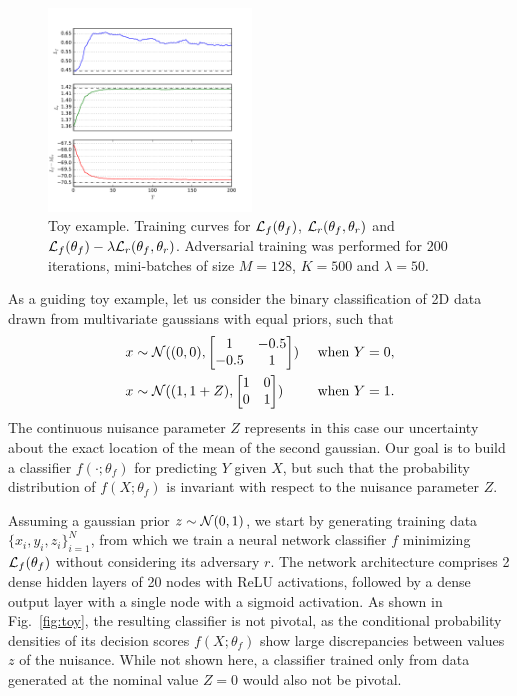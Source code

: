 \documentclass[twocolumn,superscriptaddress,aps]{revtex4-1}
\theoremstyle{plain}
\begin{document}
\begin{figure}
    \includegraphics[width=0.48\textwidth]{figures/training.pdf}
    \vspace{-1cm}
    \caption{Toy example. Training curves for ${\cal L}_f(\theta_f)$, ${\cal L}_r(\theta_f, \theta_r)$
             and ${\cal L}_f(\theta_f) - \lambda {\cal L}_r(\theta_f, \theta_r)$.
             Adversarial training was performed for $200$ iterations, mini-batches of size $M=128$, $K=500$ and $\lambda=50$.}
    \label{fig:toy-training}
\end{figure}

As a guiding toy example, let us consider the binary classification of 2D
data drawn from multivariate gaussians with equal priors, such that
\begin{align}
    x &\sim {\cal N}((0,0), \begin{bmatrix}
                              1 & -0.5 \\
                              -0.5 & 1
                            \end{bmatrix}) &\text{ when } Y=0, \\
    x &\sim {\cal N}((1,1+Z),  \begin{bmatrix}
                              1 & 0 \\
                              0 & 1
                             \end{bmatrix}) &\text{ when } Y=1.
\end{align}
The continuous nuisance parameter $Z$ represents in this case our
uncertainty about the exact location of the mean of the second gaussian. Our goal is to
build a classifier $f(\cdot;\theta_f)$ for predicting $Y$ given $X$, but such that
the probability distribution of $f(X;\theta_f)$ is invariant with respect to the
nuisance parameter $Z$.

Assuming a gaussian prior $z \sim {\cal N}(0,1)$, we start by
generating training data $\{ x_i, y_i, z_i \}_{i=1}^N$, from which we train a
neural network classifier $f$ minimizing ${\cal L}_f(\theta_f)$ without
considering its adversary $r$. The network architecture comprises 2 dense hidden layers of 20
nodes with ReLU activations, followed  by a dense output layer with a single
node with a sigmoid activation. As shown in
Fig.~\ref{fig:toy}, the resulting classifier is not pivotal, as the
conditional probability densities of its decision scores $f(X;\theta_f)$ show
large discrepancies between values $z$ of the nuisance. While not shown here, a
classifier trained only from data generated at the nominal value $Z=0$ would
also not be pivotal.
\end{document}
